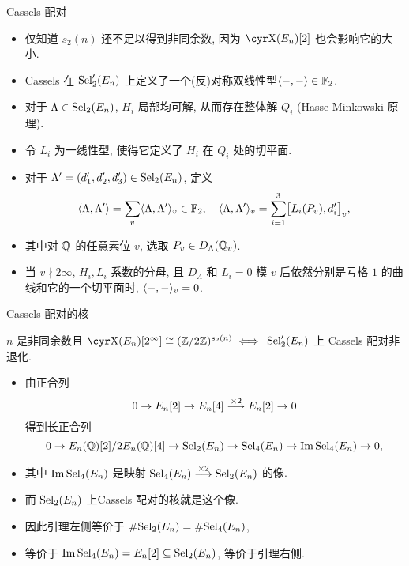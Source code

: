\documentclass[aspectratio=169,handout]{ctexbeamer}
\begin{document}
\begin{frame}{Cassels 配对}
  \begin{itemize}
    \item 仅知道 $s_2(n)$ 还不足以得到非同余数, 因为 $\Sha(E_n)[2]$ 也会影响它的大小.
    \item Cassels 在 ${\mathrm{Sel}}_2'(E_n)$ 上定义了一个(反)对称双线性型$\langle{-,-}\rangle\in{\mathbb{F}}_2$.
    \item 对于 $\Lambda\in{\mathrm{Sel}}_2(E_n)$, $H_i$ 局部均可解, 从而存在整体解 $Q_i$ (Hasse-Minkowski 原理).
    \item 令 $L_i$ 为一线性型, 使得它定义了 $H_i$ 在 $Q_i$ 处的切平面.
    \item 对于 $\Lambda'=(d'_1,d'_2,d'_3)\in{\mathrm{Sel}}_2(E_n)$, 定义
    \[
      \langle{\Lambda,\Lambda'}\rangle=\sum_v\langle{\Lambda,\Lambda'}\rangle_v\in{\mathbb{F}}_2,
      \quad
      \langle{\Lambda,\Lambda'}\rangle_v
      =\sum_{i=1}^3 \bigl[L_i(P_v),d_i'\bigr]_v,
    \]
    \item 其中对 ${\mathbb{Q}}$ 的任意素位 $v$, 选取 $P_v\in D_\Lambda({\mathbb{Q}}_v)$.
    \item 当 $v\nmid 2\infty$, $H_i,L_i$ 系数的分母, 且 $D_\Lambda$ 和 $L_i=0$ 模 $v$ 后依然分别是亏格 $1$ 的曲线和它的一个切平面时, $\langle{-,-}\rangle_v=0$.
  \end{itemize}
\end{frame}


\begin{frame}{Cassels 配对的核}
  \onslide<+->
  \begin{lemma}[Wang2016]
    $n$ 是非同余数且 $\Sha(E_n)[2^\infty]\cong(\BZ/2\BZ)^{s_2(n)}\iff$
    ${\mathrm{Sel}}_2'(E_n)$ 上 Cassels 配对非退化.
  \end{lemma}
  \onslide<+->
  \begin{itemize}
    \item 由正合列
    \[
      0\rightarrow E_n[2]\rightarrow E_n[4] \stackrel{\times 2}{\longrightarrow} E_n[2]\rightarrow 0
    \]
    得到长正合列
    \[
      0\rightarrow {E_n({\mathbb{Q}})[2]}/{2E_n({\mathbb{Q}})[4]}\rightarrow {\mathrm{Sel}}_2(E_n)\rightarrow {\mathrm{Sel}}_4(E_n)\rightarrow \operatorname{Im} {\mathrm{Sel}}_4(E_n)\rightarrow 0,
    \]
    \item 其中 $\operatorname{Im} {\mathrm{Sel}}_4(E_n)$ 是映射 ${\mathrm{Sel}}_4(E_n)\stackrel{\times 2}{\longrightarrow} {\mathrm{Sel}}_2(E_n)$ 的像.
    \item 而 ${\mathrm{Sel}}_2(E_n)$ 上Cassels 配对的核就是这个像.
    \item 因此引理左侧等价于 $\#{\mathrm{Sel}}_2(E_n) = \#{\mathrm{Sel}}_4(E_n)$, 
    \item 等价于 $\operatorname{Im} {\mathrm{Sel}}_4(E_n)=E_n[2]\subseteq {\mathrm{Sel}}_2(E_n)$, 等价于引理右侧.
  \end{itemize}
\end{frame}
\end{document}
